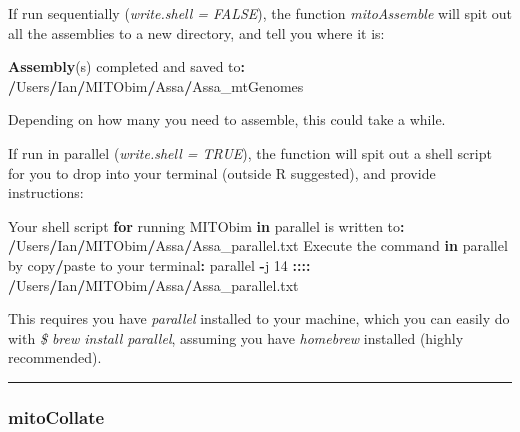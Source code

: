 \documentclass[]{article}
\newenvironment{Shaded}{\begin{snugshade}}{\end{snugshade}}
\newcommand{\ControlFlowTok}[1]{\textcolor[rgb]{0.13,0.29,0.53}{\textbf{#1}}}
\newcommand{\DecValTok}[1]{\textcolor[rgb]{0.00,0.00,0.81}{#1}}
\newcommand{\ErrorTok}[1]{\textcolor[rgb]{0.64,0.00,0.00}{\textbf{#1}}}
\newcommand{\KeywordTok}[1]{\textcolor[rgb]{0.13,0.29,0.53}{\textbf{#1}}}
\newcommand{\NormalTok}[1]{#1}
\newcommand{\OperatorTok}[1]{\textcolor[rgb]{0.81,0.36,0.00}{\textbf{#1}}}
\newcommand{\StringTok}[1]{\textcolor[rgb]{0.31,0.60,0.02}{#1}}
\renewcommand{\linethickness}{0.05em}
\begin{document}
If run sequentially (\emph{write.shell = FALSE}), the function
\emph{mitoAssemble} will spit out all the assemblies to a new directory,
and tell you where it is:

\begin{Shaded}
\begin{Highlighting}[]
\KeywordTok{Assembly}\NormalTok{(s) completed and saved to}\OperatorTok{:}\StringTok{ }\ErrorTok{/}\NormalTok{Users}\OperatorTok{/}\NormalTok{Ian}\OperatorTok{/}\NormalTok{MITObim}\OperatorTok{/}\NormalTok{Assa}\OperatorTok{/}\NormalTok{Assa_mtGenomes}
\end{Highlighting}
\end{Shaded}

Depending on how many you need to assemble, this could take a while.

If run in parallel (\emph{write.shell = TRUE}), the function will spit
out a shell script for you to drop into your terminal (outside R
suggested), and provide instructions:

\begin{Shaded}
\begin{Highlighting}[]
\NormalTok{Your shell script }\ControlFlowTok{for}\NormalTok{ running MITObim }\ControlFlowTok{in}\NormalTok{ parallel is written to}\OperatorTok{:}
\ErrorTok{/}\NormalTok{Users}\OperatorTok{/}\NormalTok{Ian}\OperatorTok{/}\NormalTok{MITObim}\OperatorTok{/}\NormalTok{Assa}\OperatorTok{/}\NormalTok{Assa_parallel.txt}
\NormalTok{Execute the command }\ControlFlowTok{in}\NormalTok{ parallel by copy}\OperatorTok{/}\NormalTok{paste to your terminal}\OperatorTok{:}
\NormalTok{parallel }\OperatorTok{-}\NormalTok{j }\DecValTok{14} \OperatorTok{:::}\ErrorTok{:}\StringTok{ }\ErrorTok{/}\NormalTok{Users}\OperatorTok{/}\NormalTok{Ian}\OperatorTok{/}\NormalTok{MITObim}\OperatorTok{/}\NormalTok{Assa}\OperatorTok{/}\NormalTok{Assa_parallel.txt}
\end{Highlighting}
\end{Shaded}

This requires you have \emph{parallel} installed to your machine, which
you can easily do with \emph{\$ brew install parallel}, assuming you
have \emph{homebrew} installed (highly recommended).

\begin{center}\rule{0.5\linewidth}{\linethickness}\end{center}

\hypertarget{mitocollate}{%
\subsubsection{mitoCollate}\label{mitocollate}}
\end{document}
